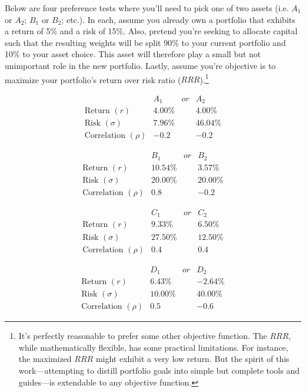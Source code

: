 \documentclass[]{article}
\let\rmarkdownfootnote\footnote%
\def\footnote{\protect\rmarkdownfootnote}
\begin{document}
Below are four preference tests where you'll need to pick one of two
assets (i.e. \(A_1\) or \(A_2\); \(B_1\) or \(B_2\); etc.). In each,
assume you already own a portfolio that exhibits a return of 5\% and a
risk of 15\%. Also, pretend you're seeking to allocate capital such that
the resulting weights will be split 90\% to your current portfolio and
10\% to your asset choice. This asset will therefore play a small but
not unimportant role in the new portfolio. Lastly, assume you're
objective is to maximize your portfolio's return over risk ratio
(\(RRR\)).\footnote{It's perfectly reasonable to prefer some other
  objective function. The \(RRR\), while mathematically flexible, has
  some practical limitations. For instance, the maximized \(RRR\) might
  exhibit a very low return. But the spirit of this work---attempting to
  distill portfolio goals into simple but complete tools and guides---is
  extendable to any objective function.}

\[
\begin{array}{r|c|c|c}
\text{}                   & A_1    & or & A_2 \\
\hline{}
\text{Return }(r)       & 4.00\% &    & 4.00\% \\
\text{Risk }(\sigma)      & 7.96\% &    & 46.04\% \\
\text{Correlation }(\rho) & -0.2   &    & -0.2
\end{array}
\]

\[
\begin{array}{r|c|c|c}
\text{}                   & B_1     & or & B_2  \\
\hline
\text{Return }(r)       & 10.54\% &    & 3.57\% \\
\text{Risk }(\sigma)      & 20.00\% &    & 20.00\% \\
\text{Correlation }(\rho) & 0.8     &    & -0.2
\end{array}
\]

\[
\begin{array}{r|c|c|c}
\text{}                   & C_1     & or & C_2 \\
\hline{}
\text{Return }(r)       & 9.33\%  &    & 6.50\% \\
\text{Risk }(\sigma)      & 27.50\% &    & 12.50\% \\
\text{Correlation }(\rho) & 0.4     &    & 0.4
\end{array}
\]

\[
\begin{array}{r|c|c|c}
\text{}                   & D_1     & or & D_2 \\
\hline{}
\text{Return }(r)       & 6.43\%  &    & -2.64\% \\
\text{Risk }(\sigma)      & 10.00\% &    & 40.00\% \\
\text{Correlation }(\rho) & 0.5     &    & -0.6
\end{array}
\]
\end{document}
